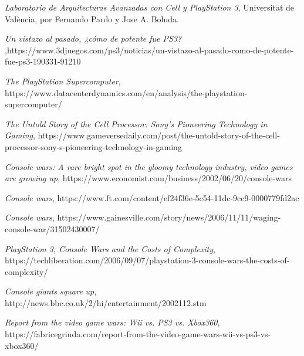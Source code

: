 \documentclass[11pt,compsoc]{IEEEtran}
\begin{document}
	
		\begin{thebibliography}{1}
			
			{\it{Laboratorio de Arquitecturas Avanzadas con Cell y PlayStation 3}}, Universitat de València, por Fernando Pardo y Jose A. Boluda.
			
			{\it{Un vistazo al pasado, ¿cómo de potente fue PS3? }},https://www.3djuegos.com/ps3/noticias/un-vistazo-al-pasado-como-de-potente-fue-ps3-190331-91210
		
			{\it{The PlayStation Supercomputer}}, https://www.datacenterdynamics.com/en/analysis/the-playstation-supercomputer/
			
			{\it{The Untold Story of the Cell Processor: Sony's Pioneering Technology in Gaming}}, https://www.gameversedaily.com/post/the-untold-story-of-the-cell-processor-sony-s-pioneering-technology-in-gaming
			
			{\it{Console wars: A rare bright spot in the gloomy technology industry, video games are growing up}}, 
			https://www.economist.com/business/2002/06/20/console-wars
			
			{\it{Console wars}}, 			https://www.ft.com/content/ef24f36e-5c54-11dc-9cc9-0000779fd2ac
			
			{\it{Console wars}}, 			
			https://www.gainesville.com/story/news/2006/11/11/waging-console-war/31502430007/
			
			{\it{PlayStation 3, Console Wars and the Costs of Complexity}}, 			
			https://techliberation.com/2006/09/07/playstation-3-console-wars-the-costs-of-complexity/
			
			{\it{Console giants square up}}, 			
			http://news.bbc.co.uk/2/hi/entertainment/2002112.stm
			
			{\it{Report from the video game wars: Wii vs. PS3 vs. Xbox360}}, 
			https://fabricegrinda.com/report-from-the-video-game-wars-wii-vs-ps3-vs-xbox360/
		
		\end{thebibliography}
		
			
	
		
\end{document}
